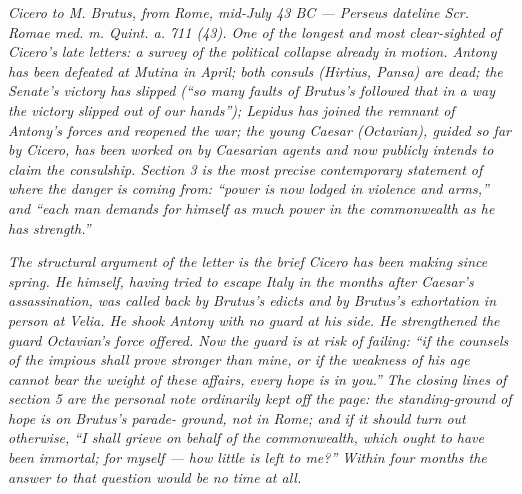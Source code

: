 
\textit{Cicero to M. Brutus, from Rome, mid-July 43 BC
--- Perseus dateline \textit{Scr. Romae med. m. Quint.
a. 711 (43)}. One of the longest and most clear-sighted
of Cicero's late letters: a survey of the political
collapse already in motion. Antony has been defeated at
Mutina in April; both consuls (Hirtius, Pansa) are dead;
the Senate's victory has slipped (``so many faults of
Brutus's followed that in a way the victory slipped out
of our hands''); Lepidus has joined the remnant of
Antony's forces and reopened the war; the young Caesar
(Octavian), guided so far by Cicero, has been worked on
by Caesarian agents and now publicly intends to claim
the consulship. Section 3 is the most precise
contemporary statement of where the danger is coming
from: ``power is now lodged in violence and arms,'' and
``each man demands for himself as much power in the
commonwealth as he has strength.''}

\textit{The structural argument of the letter is the
brief Cicero has been making since spring. He himself,
having tried to escape Italy in the months after
Caesar's assassination, was called back by Brutus's
edicts and by Brutus's exhortation in person at Velia.
He shook Antony with no guard at his side. He
strengthened the guard Octavian's force offered. Now
the guard is at risk of failing: ``if the counsels of
the impious shall prove stronger than mine, or if the
weakness of his age cannot bear the weight of these
affairs, every hope is in you.'' The closing lines of
section 5 are the personal note ordinarily kept off the
page: the standing-ground of hope is on Brutus's parade-
ground, not in Rome; and if it should turn out
otherwise, ``I shall grieve on behalf of the
commonwealth, which ought to have been immortal; for
myself --- how little is left to me?'' Within four
months the answer to that question would be no time at
all.}
